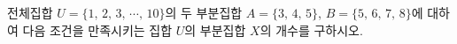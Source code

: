 전체집합 $U=\{1,\,2,\,3,\,\cdots,\,10\}$의 두 부분집합 $A=\{3,\,4,\,5\}$, $B=\{5,\,6,\,7,\,8\}$에 대하여 다음 조건을 만족시키는 집합 $U$의 부분집합 $X$의 개수를 구하시오. 

